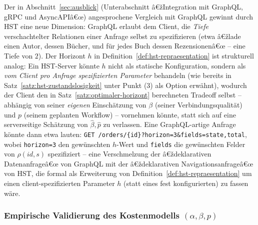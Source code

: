 ﻿\documentclass[a4paper,12pt]{article}
\theoremstyle{definition}
\begin{document}
Der in Abschnitt~\ref{sec:ausblick} (Unterabschnitt â€žIntegration mit GraphQL, gRPC und
AsyncAPIâ€œ) angesprochene Vergleich mit GraphQL gewinnt durch HST eine neue Dimension:
GraphQL erlaubt dem Client, die \emph{Tiefe} verschachtelter Relationen einer Anfrage
selbst zu spezifizieren (etwa â€žlade einen Autor, dessen Bücher, und für jedes Buch dessen
Rezensionenâ€œ -- eine Tiefe von $2$). Der Horizont $h$ in
Definition~\ref{def:hst-repraesentation} ist strukturell analog: Ein HST-Server könnte
$h$ nicht als statische Konfiguration, sondern als \emph{vom Client pro Anfrage
spezifizierten Parameter} behandeln (wie bereits in Satz~\ref{satz:hst-zustandslosigkeit}
unter Punkt (3) als Option erwähnt), wodurch der Client den in
Satz~\ref{satz:optimaler-horizont} berechneten Tradeoff selbst -- abhängig von seiner
\emph{eigenen} Einschätzung von $\beta$ (seiner Verbindungsqualität) und $p$ (seinem
geplanten Workflow) -- vornehmen könnte, statt sich auf eine serverseitige Schätzung von
$\hat\beta,\hat p$ zu verlassen. Eine GraphQL-artige Anfrage könnte dann etwa lauten:
\texttt{GET /orders/\{id\}?horizon=3\&fields=state,total}, wobei \texttt{horizon=3} den
gewünschten $h$-Wert und \texttt{fields} die gewünschten Felder von $\rho(id,s)$
spezifiziert -- eine Verschmelzung der â€ždeklarativen Datenanfrageâ€œ von GraphQL mit der
â€ždeklarativen Navigationsanfrageâ€œ von HST, die formal als Erweiterung von
Definition~\ref{def:hst-repraesentation} um einen client-spezifizierten Parameter $h$
(statt eines fest konfigurierten) zu fassen wäre.

\subsubsection{Empirische Validierung des Kostenmodells $(\alpha,\beta,p)$}
\end{document}
